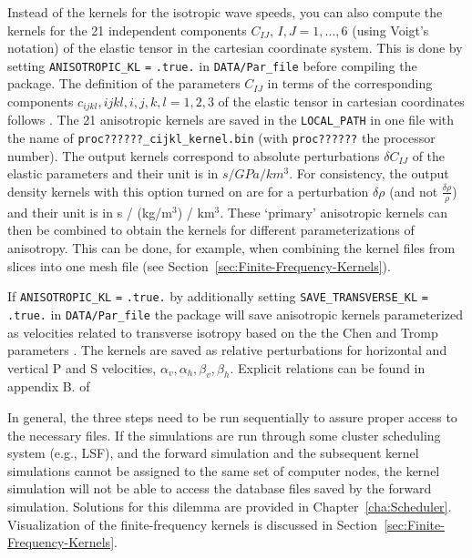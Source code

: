 \begin{enumerate}
Instead of the kernels for the isotropic wave speeds, you can also
compute the kernels for the 21 independent components $C_{IJ},\, I,J=1,...,6$
(using Voigt's notation) of the elastic tensor in the cartesian coordinate
system. This is done by setting \texttt{ANISOTROPIC\_KL} \texttt{=}
\texttt{.true.} in \texttt{DATA/Par\_file} before compiling the package.
The definition of the parameters $C_{IJ}$ in terms of the corresponding
components $c_{ijkl},ijkl,i,j,k,l=1,2,3$ of the elastic tensor in
cartesian coordinates follows \citet{ChTr07}. The 21 anisotropic
kernels are saved in the \texttt{LOCAL\_PATH} in one file with the
name of \texttt{proc??????\_cijkl\_kernel.bin} (with \texttt{proc??????}
the processor number). The output kernels correspond to absolute perturbations
$\delta C_{IJ}$ of the elastic parameters and their unit is in $s/GPa/km^{3}$.
For consistency, the output density kernels with this option turned
on are for a perturbation $\delta\rho$ (and not $\frac{\delta\rho}{\rho}$)
and their unit is in s / (kg/m$^{3}$) / km$^{3}$. These `primary'
anisotropic kernels can then be combined to obtain the kernels for
different parameterizations of anisotropy. This can be done, for example,
when combining the kernel files from slices into one mesh file (see
Section~\ref{sec:Finite-Frequency-Kernels}).\newline


If \texttt{ANISOTROPIC\_KL} \texttt{=} \texttt{.true.} by additionally
setting \texttt{SAVE\_TRANSVERSE\_KL} \texttt{=} \texttt{.true.} in \texttt{DATA/Par\_file}
the package will save anisotropic kernels parameterized as velocities
related to transverse isotropy based on the the Chen and Tromp parameters
\citet{ChTr07}. The kernels are saved as relative perturbations for
horizontal and vertical P and S velocities, $\alpha_{v},\alpha_{h},\beta_{v},\beta_{h}$.
Explicit relations can be found in appendix B. of \citet{SiLiTrTr07b}\newline


\end{enumerate}

In general, the three steps need to be run sequentially to assure
proper access to the necessary files. If the simulations are run through
some cluster scheduling system (e.g., LSF), and the forward simulation
and the subsequent kernel simulations cannot be assigned to the same
set of computer nodes, the kernel simulation will not be able to access
the database files saved by the forward simulation. Solutions for
this dilemma are provided in Chapter~\ref{cha:Scheduler}. Visualization
of the finite-frequency kernels is discussed in Section~\ref{sec:Finite-Frequency-Kernels}.

